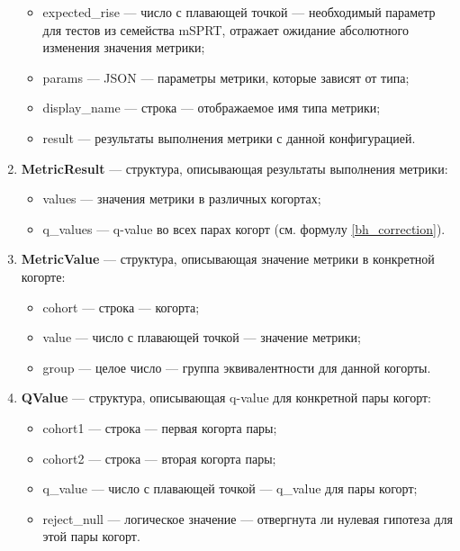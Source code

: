 \documentclass[../document.tex]{subfiles}
\begin{document}
\begin{enumerate}
\begin{itemize}
			\item expected\_rise --- число с плавающей точкой --- необходимый параметр для тестов из семейства mSPRT, отражает ожидание абсолютного изменения значения метрики;
			\item params --- JSON --- параметры метрики, которые зависят от типа;
			\item display\_name --- строка --- отображаемое имя типа метрики;
			\item result --- результаты выполнения метрики с данной конфигурацией.
		\end{itemize}
		\item \textbf{MetricResult} --- структура, описывающая результаты выполнения метрики:
		\begin{itemize}
			\item values --- значения метрики в различных когортах;
			\item q\_values --- q-value во всех парах когорт (см. формулу \ref{bh_correction}).
		\end{itemize}
		\item \textbf{MetricValue} --- структура, описывающая значение метрики в конкретной когорте:
		\begin{itemize}
			\item cohort --- строка --- когорта;
			\item value --- число с плавающей точкой --- значение метрики;
			\item group --- целое число --- группа эквивалентности для данной когорты.
		\end{itemize}
		\item \textbf{QValue} --- структура, описывающая q-value для конкретной пары когорт:
		\begin{itemize}
			\item cohort1 --- строка --- первая когорта пары;
			\item cohort2 --- строка --- вторая когорта пары;
			\item q\_value --- число с плавающей точкой --- q\_value для пары когорт;
			\item reject\_null --- логическое значение --- отвергнута ли нулевая гипотеза для этой пары когорт.
		\end{itemize}
	\end{enumerate}
\end{document}

